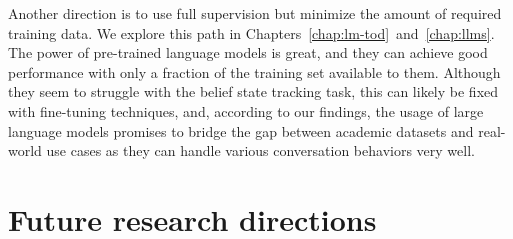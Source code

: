 Another direction is to use full supervision but minimize the amount of required training data.
We explore this path in Chapters~\ref{chap:lm-tod}~and~\ref{chap:llms}.
The power of pre-trained language models is great, and they can achieve good performance with only a fraction of the training set available to them.
Although they seem to struggle with the belief state tracking task, this can likely be fixed with fine-tuning techniques, and, according to our findings, the usage of large language models promises to bridge the gap between academic datasets and real-world use cases as they can handle various conversation behaviors very well. 

\section{Future research directions}
